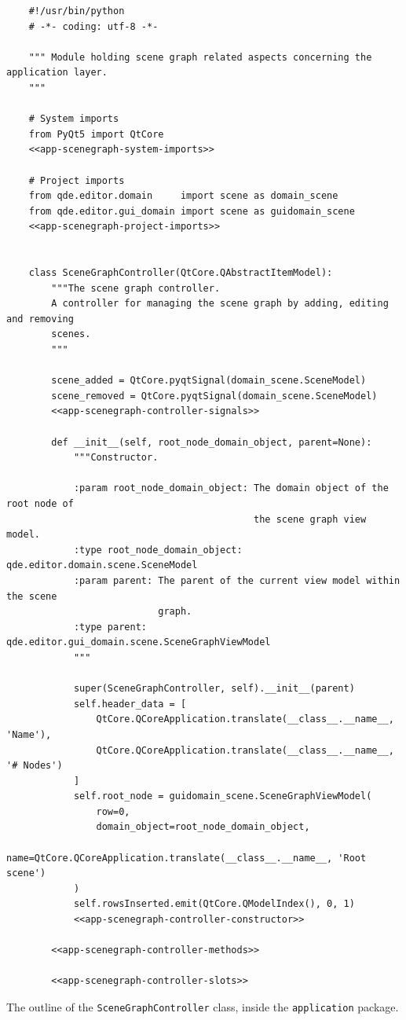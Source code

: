 \documentclass[10pt, openright, notitlepage]{scrreprt}
\begin{document}
\begin{listing}[H]
\begin{verbatim}
    #!/usr/bin/python
    # -*- coding: utf-8 -*-
    
    """ Module holding scene graph related aspects concerning the application layer.
    """
    
    # System imports
    from PyQt5 import QtCore
    <<app-scenegraph-system-imports>>
    
    # Project imports
    from qde.editor.domain     import scene as domain_scene
    from qde.editor.gui_domain import scene as guidomain_scene
    <<app-scenegraph-project-imports>>
    
    
    class SceneGraphController(QtCore.QAbstractItemModel):
        """The scene graph controller.
        A controller for managing the scene graph by adding, editing and removing
        scenes.
        """
    
        scene_added = QtCore.pyqtSignal(domain_scene.SceneModel)
        scene_removed = QtCore.pyqtSignal(domain_scene.SceneModel)
        <<app-scenegraph-controller-signals>>
    
        def __init__(self, root_node_domain_object, parent=None):
            """Constructor.
    
            :param root_node_domain_object: The domain object of the root node of
                                            the scene graph view model.
            :type root_node_domain_object:  qde.editor.domain.scene.SceneModel
            :param parent: The parent of the current view model within the scene
                           graph.
            :type parent:  qde.editor.gui_domain.scene.SceneGraphViewModel
            """
    
            super(SceneGraphController, self).__init__(parent)
            self.header_data = [
                QtCore.QCoreApplication.translate(__class__.__name__, 'Name'),
                QtCore.QCoreApplication.translate(__class__.__name__, '# Nodes')
            ]
            self.root_node = guidomain_scene.SceneGraphViewModel(
                row=0,
                domain_object=root_node_domain_object,
                name=QtCore.QCoreApplication.translate(__class__.__name__, 'Root scene')
            )
            self.rowsInserted.emit(QtCore.QModelIndex(), 0, 1)
            <<app-scenegraph-controller-constructor>>
    
        <<app-scenegraph-controller-methods>>
    
        <<app-scenegraph-controller-slots>>
\end{verbatim}
\caption{\label{lst:app-scenegraph}
The outline of the \texttt{SceneGraphController} class, inside the \texttt{application} package.}
\end{listing}
\end{document}
